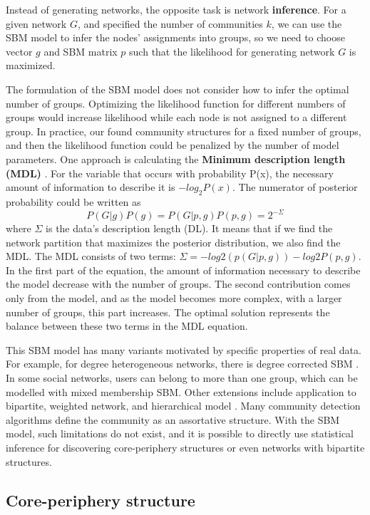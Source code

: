 Instead of generating networks, the opposite task is network \textbf{inference}. For a given network $G$, and specified the number of communities $k$, we can use the SBM model to infer the nodes' assignments into groups, so we need to choose vector $g$ and SBM matrix $p$ such that the likelihood for generating network $G$ is maximized. 

The formulation of the SBM model does not consider how to infer the optimal number of groups. Optimizing the likelihood function for different numbers of groups would increase likelihood while each node is not assigned to a different group. In practice, our found community structures for a fixed number of groups, and then the likelihood function could be penalized by the number of model parameters. One approach is calculating the \textbf{Minimum description length (MDL)} \cite{peixoto2019bayesian}. For the variable that occurs with probability P(x), the necessary amount of information to describe it is $-log_2P(x)$. The numerator of posterior probability could be written as
\begin{equation}
P(G|g)P(g) = P(G|p, g)P(p, g)=2^{-\Sigma}
\end{equation}
where $\Sigma$ is the data's description length (DL). It means that if we find the network partition that maximizes the posterior distribution, we also find the MDL. The MDL consists of two terms: $\Sigma = -log2(p(G|p,g))-log2P(p,g)$. In the first part of the equation, the amount of information necessary to describe the model decrease with the number of groups. The second contribution comes only from the model, and as the model becomes more complex, with a larger number of groups, this part increases. The optimal solution represents the balance between these two terms in the MDL equation.  

This SBM model has many variants motivated by specific properties of real data. For example, for degree heterogeneous networks, there is degree corrected SBM \cite{karrer2011stochastic}. In some social networks, users can belong to more than one group, which can be modelled with mixed membership SBM. Other extensions include application to bipartite, weighted network, and hierarchical model \cite{funke2019}. Many community detection algorithms define the community as an assortative structure. With the SBM model, such limitations do not exist, and it is possible to directly use statistical inference for discovering core-periphery structures or even networks with bipartite structures.  

\subsection{Core-periphery structure}


